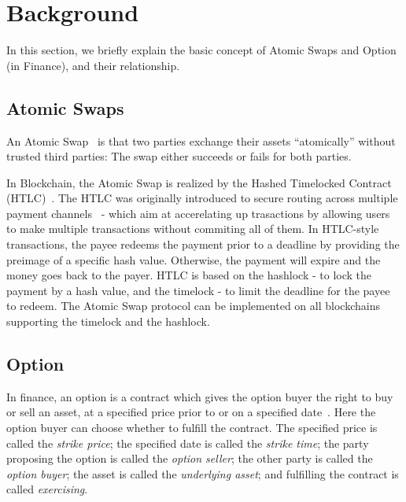 \section{Background}
\label{sec:background}

In this section, we briefly explain the basic concept of Atomic Swaps and Option (in Finance), and their relationship.

\subsection{Atomic Swaps}

An Atomic Swap~\cite{nolan2013alt} is that two parties exchange their assets ``atomically'' without trusted third parties:
The swap either succeeds or fails for both parties.

In Blockchain, the Atomic Swap is realized by the Hashed Timelocked Contract (HTLC)~\cite{poon2016bitcoin}. The HTLC was originally introduced to secure routing across multiple payment channels~\cite{paychannel2018btcwiki} - which aim at accerelating up trasactions by allowing users to make multiple transactions without commiting all of them.
In HTLC-style transactions, the payee redeems the payment prior to a deadline by providing the preimage of a specific hash value.
Otherwise, the payment will expire and the money goes back to the payer.
HTLC is based on the hashlock - to lock the payment by a hash value, and the timelock - to limit the deadline for the payee to redeem.
The Atomic Swap protocol can be implemented on all blockchains supporting the timelock and the hashlock.

\subsection{Option}
\label{subsec:background_option}

In finance, an option is a contract which gives the option buyer the right to buy or sell an asset, at a specified price prior to or on a specified date~\cite{higham2004introduction}.
Here the option buyer can choose whether to fulfill the contract.
The specified price is called the \textit{strike price};
the specified date is called the \textit{strike time};
the party proposing the option is called the \textit{option seller};
the other party is called the \textit{option buyer};
the asset is called the \textit{underlying asset};
and fulfilling the contract is called \textit{exercising}.

